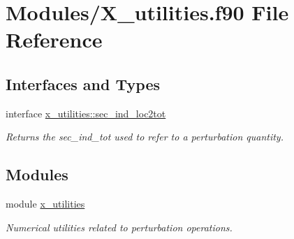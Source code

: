 \hypertarget{X__utilities_8f90}{}\section{Modules/\+X\+\_\+utilities.f90 File Reference}
\label{X__utilities_8f90}
\subsection*{Interfaces and Types}
\begin{DoxyCompactItemize}
\item 
interface \hyperlink{interfacex__utilities_1_1sec__ind__loc2tot}{x\+\_\+utilities\+::sec\+\_\+ind\+\_\+loc2tot}
\begin{DoxyCompactList}\small\item\em Returns the {\ttfamily sec\+\_\+ind\+\_\+tot} used to refer to a perturbation quantity. \end{DoxyCompactList}\end{DoxyCompactItemize}
\subsection*{Modules}
\begin{DoxyCompactItemize}
\item 
module \hyperlink{namespacex__utilities}{x\+\_\+utilities}
\begin{DoxyCompactList}\small\item\em Numerical utilities related to perturbation operations. \end{DoxyCompactList}\end{DoxyCompactItemize}
